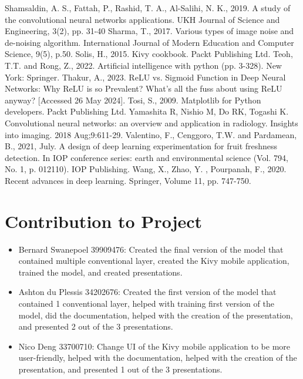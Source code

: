 \documentclass[conference]{IEEEtran}
\begin{document}
\begin{thebibliography}{00}
     Shamsaldin, A. S., Fattah, P., Rashid, T. A., Al-Salihi, N. K., 2019. A study of the convolutional neural networks applications. UKH Journal of Science and Engineering, 3(2), pp. 31-40
     Sharma, T., 2017. Various types of image noise and de-noising algorithm. International Journal of Modern Education and Computer Science, 9(5), p.50.
     Solis, H., 2015. Kivy cookbook. Packt Publishing Ltd.
     Teoh, T.T. and Rong, Z., 2022. Artificial intelligence with python (pp. 3-328). New York: Springer.
     Thakur, A., 2023. ReLU vs. Sigmoid Function in Deep Neural Networks: Why ReLU is so Prevalent? What's all the fuss about using ReLU anyway? [Accessed 26 May 2024].
     Tosi, S., 2009. Matplotlib for Python developers. Packt Publishing Ltd.
     Yamashita R, Nishio M, Do RK, Togashi K. Convolutional neural networks: an overview and application in radiology. Insights into imaging. 2018 Aug;9:611-29.
     Valentino, F., Cenggoro, T.W. and Pardamean, B., 2021, July. A design of deep learning experimentation for fruit freshness detection. In IOP conference series: earth and environmental science (Vol. 794, No. 1, p. 012110). IOP Publishing.
     Wang, X., Zhao, Y. , Pourpanah, F., 2020. Recent advances in deep
    learning. Springer, Volume 11, pp. 747-750.    

\end{thebibliography}

\section*{Contribution to Project}
\begin{itemize}
    \item Bernard Swanepoel 39909476: Created the final version of the model that contained multiple conventional layer, created the Kivy mobile application, trained the model, and created presentations.
    \item Ashton du Plessis 34202676: Created the first version of the model that contained 1 conventional layer, helped with training first version of the model, did the documentation, helped with the creation of the presentation, and presented 2 out of the 3 presentations.
    \item Nico Deng 33700710: Change UI of the Kivy mobile application to be more user-friendly, helped with the documentation, helped with the creation of the presentation, and presented 1 out of the 3 presentations.
\end{itemize}
\end{document}

